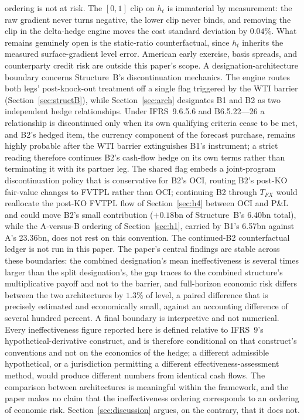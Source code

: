 \documentclass[11pt,a4paper]{article}
\begin{document}
ordering is not at risk. The $[0,1]$ clip on $h_t$ is immaterial by measurement: the raw gradient never turns negative, the lower clip never binds, and removing the clip in the delta-hedge engine moves the cost standard deviation by $0.04\%$. What remains genuinely open is the static-ratio counterfactual, since $h_t$ inherits the measured surface-gradient level error. American early exercise, basis spreads, and counterparty credit risk are outside this paper's scope. A designation-architecture boundary concerns Structure~B's discontinuation mechanics. The engine routes both legs' post-knock-out treatment off a single flag triggered by the WTI barrier (Section~\ref{sec:structB}), while Section~\ref{sec:arch} designates B1 and B2 as two independent hedge relationships. Under IFRS~9.6.5.6 and B6.5.22---26 a relationship is discontinued only when its own qualifying criteria cease to be met, and B2's hedged item, the currency component of the forecast purchase, remains highly probable after the WTI barrier extinguishes B1's instrument; a strict reading therefore continues B2's cash-flow hedge on its own terms rather than terminating it with its partner leg. The shared flag embeds a joint-program discontinuation policy that is conservative for B2's OCI, routing B2's post-KO fair-value changes to FVTPL rather than OCI; continuing B2 through $T_{FX}$ would reallocate the post-KO FVTPL flow of Section~\ref{sec:h4} between OCI and P\&L and could move B2's small contribution ($+0.18$bn of Structure~B's 6.40bn total), while the A-versus-B ordering of Section~\ref{sec:h1}, carried by B1's 6.57bn against A's 23.36bn, does not rest on this convention. The continued-B2 counterfactual ledger is not run in this paper. The paper's central findings are stable across these boundaries: the combined designation's mean ineffectiveness is several times larger than the split designation's, the gap traces to the combined structure's multiplicative payoff and not to the barrier, and full-horizon economic risk differs between the two architectures by $1.3\%$ of level, a paired difference that is precisely estimated and economically small, against an accounting difference of several hundred percent. A final boundary is interpretive and not numerical. Every ineffectiveness figure reported here is defined relative to IFRS~9's hypothetical-derivative construct, and is therefore conditional on that construct's conventions and not on the economics of the hedge; a different admissible hypothetical, or a jurisdiction permitting a different effectiveness-assessment method, would produce different numbers from identical cash flows. The comparison between architectures is meaningful within the framework, and the paper makes no claim that the ineffectiveness ordering corresponds to an ordering of economic risk. Section~\ref{sec:discussion} argues, on the contrary, that it does not.
\end{document}

